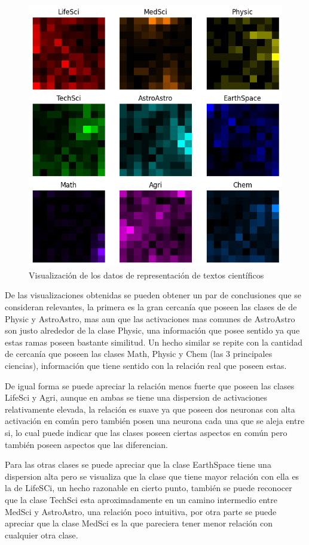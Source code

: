 \documentclass{article}
\theoremstyle{mytheoremstyle}
\theoremstyle{mytheoremstyle}
\theoremstyle{myproblemstyle}
\begin{document}
\begin{figure}[!ht]
  \centering
  \includegraphics[width=0.7\linewidth]{images/output.png}
  \caption{Visualización de los datos de representación de textos científicos}
  \label{fig:output}
\end{figure}

\newpage

De las visualizaciones obtenidas se pueden obtener un par de conclusiones que se consideran relevantes, la primera es la gran cercanía que poseen las clases de de Physic y AstroAstro, mas aun que las activaciones mas comunes de AstroAstro son justo alrededor de la clase Physic, una información que posee sentido ya que estas ramas poseen bastante similitud. Un hecho similar se repite con la cantidad de cercanía que poseen las clases Math, Physic y Chem (las 3 principales ciencias), información que tiene sentido con la relación real que poseen estas.

De igual forma se puede apreciar la relación menos fuerte que poseen las clases LifeSci y Agri, aunque en ambas se tiene una dispersion de activaciones relativamente elevada, la relación es suave ya que poseen dos neuronas con alta activación en común pero también posen una neurona cada una que se aleja entre si, lo cual puede indicar que las clases poseen ciertas aspectos en común pero también poseen aspectos que las diferencian.

Para las otras clases se puede apreciar que la clase EarthSpace tiene una dispersion alta pero se visualiza que la clase que tiene mayor relación con ella es la de LifeSCi, un hecho razonable en cierto punto, también se puede reconocer que la clase TechSci esta aproximadamente en un camino intermedio entre MedSci y AstroAstro, una relación poco intuitiva, por otra parte se puede apreciar que la clase MedSci es la que pareciera tener menor relación con cualquier otra clase.
\end{document}
